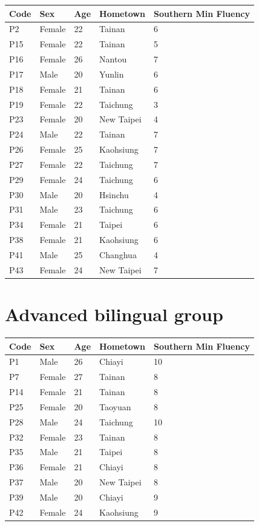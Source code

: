 \documentclass[12pt]{report}
\begin{document}
\begin{CJK}{UTF8}{bsmi}
\begin{flushleft}
\begin{table}[hbt!]
\begin{tabularx}{\textwidth}{|l||X|X|X|X|}
\hline
Code&Sex&Age&Hometown&Southern Min Fluency\\
\hline
\hline
P2&Female&22&Tainan&6\\
\hline
P15&Female&22&Tainan&5\\
\hline
P16&Female&26&Nantou&7\\
\hline
P17&Male&20&Yunlin&6\\
\hline
P18&Female&21&Tainan&6\\
\hline
P19&Female&22&Taichung&3\\
\hline
P23&Female&20&New Taipei&4\\
\hline
P24&Male&22&Tainan&7\\
\hline
P26&Female&25&Kaohsiung&7\\
\hline
P27&Female&22&Taichung&7\\
\hline
P29&Female&24&Taichung&6\\
\hline
P30&Male&20&Hsinchu&4\\
\hline
P31&Male&23&Taichung&6\\
\hline
P34&Female&21&Taipei&6\\
\hline
P38&Female&21&Kaohsiung&6\\
\hline
P41&Male&25&Changhua&4\\
\hline
P43&Female&24&New Taipei&7\\
\hline

\end{tabularx}
\end{table}
\end{flushleft}

\section{Advanced bilingual group}

\begin{flushleft}
\begin{table}[hbt!]
\begin{tabularx}{\textwidth}{|l||X|X|X|X|}
\hline
Code&Sex&Age&Hometown&Southern Min Fluency\\
\hline
\hline
P1&Male&26&Chiayi&10\\
\hline
P7&Female&27&Tainan&8\\
\hline
P14&Female&21&Tainan&8\\
\hline
P25&Female&20&Taoyuan&8\\
\hline
P28&Male&24&Taichung&10\\
\hline
P32&Female&23&Tainan&8\\
\hline
P35&Male&21&Taipei&8\\
\hline
P36&Female&21&Chiayi&8\\
\hline
P37&Male&20&New Taipei&8\\
\hline
P39&Male&20&Chiayi&9\\
\hline
P42&Female&24&Kaohsiung&9\\
\hline


\end{tabularx}
\end{table}
\end{flushleft}
\end{CJK}
\end{document}
